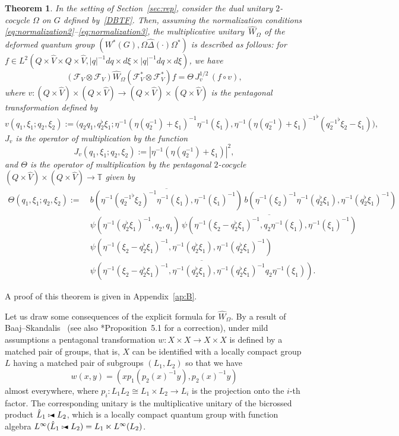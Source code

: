 \documentclass[a4paper,11pt,reqno]{amsart}
\numberwithin{equation}{section}
\newtheorem{theorem}{Theorem}[section]
\theoremstyle{remark}
\theoremstyle{definition}
\newcommand\bicrossl{%
  \mathrel{\scalerel*{\mathrel{\triangleright}\joinrel\blacktriangleleft}{x}}}
\newcommand\Dhat{{\hat\Delta}}
\newcommand\T{{\mathbb T}}
\newcommand{\CF}{\mathcal F}
\begin{document}
\begin{theorem}\label{thm:mult}
In the setting of Section~\ref{sec:rep}, consider the dual unitary $2$-cocycle $\Omega$ on $G$ defined by~\eqref{DBTF}.  Then, assuming the normalization conditions \eqref{eq:normalization2}--\eqref{eq:normalization3}, the multiplicative unitary~$\hat W_\Omega$ of the deformed quantum group $(W^*(G),\Omega\Dhat(\cdot)\Omega^*)$ is described as follows: for $f\in L^2(Q\times\hat V\times Q\times\hat V,|q|^{-1}dq\times d\xi\times |q|^{-1}dq\times d\xi)$, we have
\begin{equation}\label{eq:mult}
(\CF_V\otimes\CF_V)\hat W_\Omega (\CF_V^*\otimes\CF_V^*)f=
 \Theta \,J_{ v }^{1/2}\, (f\circ  v ),
\end{equation}
where
$ v \colon (Q\times\hat V)\times (Q\times\hat V)\to (Q\times\hat V)\times (Q\times\hat V)$ is the pentagonal transformation defined by
$$
 v (q_1,\xi_1;q_2,\xi_2):=\big(q_2q_1,q_2^\flat\xi_1;\eta^{-1}(\eta(q_2^{-1})+\xi_1)^{-1}\eta^{-1}(\xi_1),{\eta^{-1}(\eta(q_2^{-1})+\xi_1)^{-1}}^\flat
({q_2^{-1}}^\flat\xi_2-\xi_1)\big),
$$
$J_{v}$ is the operator of multiplication by the function
$$
J_{v}(q_1,\xi_1;q_2,\xi_2):=|\eta^{-1}(\eta(q_2^{-1})+\xi_1)|^2,
$$
and $\Theta$ is the operator of multiplication by the pentagonal $2$-cocycle $(Q\times\hat V)\times (Q\times\hat V)\to\T$ given by
\begin{align}
 \Theta (q_1,\xi_1;q_2,\xi_2):=\ &
 \overline {b(\eta^{-1}({q_2^{-1}}^\flat\xi_2)^{-1}\eta^{-1}(\xi_1),\eta^{-1}(\xi_1)^{-1})}\,
b(\eta^{-1}(\xi_2)^{-1}\eta^{-1}(q_2^\flat\xi_1),\eta^{-1}(q_2^\flat\xi_1)^{-1})  \nonumber\\
 &\psi(\eta^{-1}(q_2^\flat\xi_1)^{-1},q_2,q_1)
\, \overline{\psi(\eta^{-1}(\xi_2- q_2^\flat\xi_1)^{-1},q_2\eta^{-1}(\xi_1),\eta^{-1}(\xi_1)^{-1})}\nonumber\\
 & \psi(\eta^{-1}(\xi_2- q_2^\flat\xi_1)^{-1},\eta^{-1}(q_2^\flat\xi_1),\eta^{-1}(q_2^\flat\xi_1)^{-1})\nonumber\\
 &\overline{\psi(\eta^{-1}(\xi_2- q_2^\flat\xi_1)^{-1},\eta^{-1}(q_2^\flat\xi_1),\eta^{-1}(q_2^\flat\xi_1)^{-1}q_2\eta^{-1}(\xi_1))}.\label{eq:Theta}
\end{align}
\end{theorem}

A proof of this theorem is given in Appendix~\ref{ap:B}.

\smallskip

Let us draw some consequences of the explicit formula for $\hat W_\Omega$. By a result of Baaj--Skandalis~\cite{MR1652717} (see also \cite{MR1969723}*{Proposition~5.1} for a correction), under mild assumptions a pentagonal transformation $w\colon X\times X\to X\times X$ is defined by a matched pair of groups, that is, $X$ can be identified with a locally compact group $L$ having a matched pair of subgroups $(L_1,L_2)$ so that we have
$$
w(x,y)=(xp_1(p_2(x)^{-1}y),p_2(x)^{-1}y)
$$
almost everywhere, where $p_i\colon L_1L_2\cong L_1\times L_2\to L_i$ is the projection onto the $i$-th factor. The corresponding unitary is the multiplicative unitary of the bicrossed product $\hat L_1\bicrossl L_2$, which is a locally compact quantum group with function algebra $L^\infty(\hat L_1\bicrossl L_2)=L_1\ltimes L^\infty(L_2)$.
\end{document}
